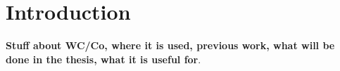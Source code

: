 \documentclass[introduction.tex]{subfiles}
\begin{document}
\chapter{Introduction}

\textbf{Stuff about WC/Co, where it is used, previous work, what will be done in the thesis, what it is useful for}.
\end{document}
